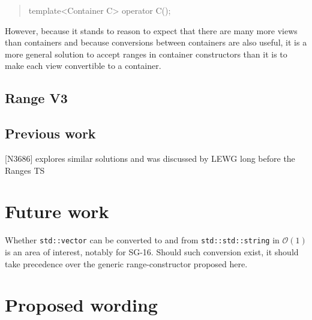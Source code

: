 \documentclass{wg21}
\newcommand{\cc}[1]{\texttt{#1}}
\begin{document}
\begin{quote}
\begin{codeblock}
template<Container C>
operator C();
\end{codeblock}
\end{quote}

However, because it stands to reason to expect that there are many more views than containers and because conversions between containers are also useful,
it is a more general solution to accept ranges in container constructors than it is to make each view convertible to a container.


\subsection{Range V3}

\subsection{Previous work}

[N3686] explores similar solutions and was discussed by LEWG long before the Ranges TS

\section{Future work}

Whether \cc{std::vector} can be converted to and from \cc{std::std::string} in $\mathcal{O}(1)$ is an area of interest, notably for SG-16.
Should such conversion exist, it should take precedence over the generic range-constructor proposed here.

\section{Proposed wording}

\end{document}
